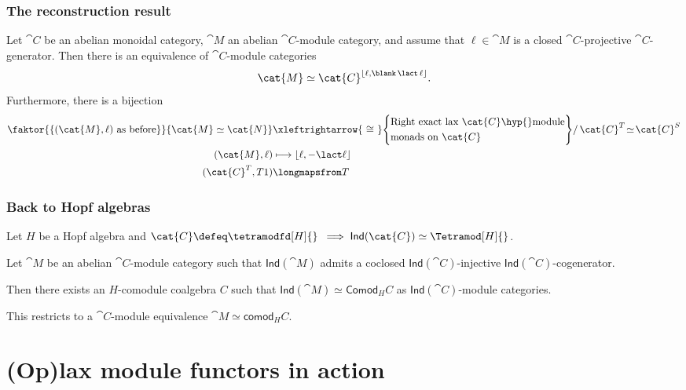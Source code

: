 \documentclass[aspectratio=169,12pt,professionalfont]{beamer}
\renewcommand*{\hom}[1]{\ensuremath{\lfloor#1\rfloor}}
\newcommand*{\Ind}{\mathsf{Ind}}
\begin{document}
\begin{frame}\frametitle{The reconstruction result}
  \begin{theorem}
    Let \(\cat{C}\) be an abelian monoidal category,
    \(\cat{M}\) an abelian \(\cat{C}\)\hyp{}module category,
    and assume that \(\ell \in \cat{M}\) is a closed \(\cat{C}\)\hyp{}projective \(\cat{C}\)\hyp{}generator.
    \pause%
    Then there is an equivalence of \(\cat{C}\)\hyp{}module categories
    \vspace{-0.2cm}\[
      \cat{M} \simeq \cat{C}^{\hom{\ell, \blank \,\lact\, \ell}}.
    \]\vspace{-0.2cm}
    \pause%
    Furthermore, there is a bijection
    \vspace{-0.2cm}\begin{align*}
      \faktor{\{(\cat{M},\ell)\ \text{as before}\}}{\cat{M} \simeq \cat{N}}
      &\xleftrightarrow{\ \cong\ }
        \Bigg\{
        \begin{aligned}
          &\text{Right exact lax \(\cat{C}\)\hyp{}module}\\
          &\text{monads on \(\cat{C}\)}
        \end{aligned}
        \Bigg\}
        /\, \cat{C}^T \!\simeq\! \cat{C}^S \\
      (\cat{M},\ell) &\longmapsto \hom{\ell,-\lact \ell} \\
      (\cat{C}^T, T1) &\longmapsfrom T
    \end{align*}
  \end{theorem}
\end{frame}

\begin{frame}\frametitle{Back to Hopf algebras}
  Let \(H\) be a Hopf algebra and \(\cat{C} \defeq \tetramodfd[H]{}\)
  \pause%
  \(\implies \Ind(\cat{C}) \simeq \Tetramod[H]{}\).
  \pause%

  Let \(\cat{M}\) be an abelian \(\cat{C}\)\hyp{}module category
  such that \(\Ind(\cat{M})\)
  admits a coclosed \(\Ind(\cat{C})\)\hyp{}injective \(\Ind(\cat{C})\)\hyp{}cogenerator.
  \pause%

  Then there exists an \(H\)\hyp{}comodule coalgebra \(C\)
  such that \(\Ind(\cat{M}) \simeq \mathsf{Comod}_{H}C\) as \(\Ind(\cat{C})\)\hyp{}module categories.
  \pause%

  This restricts to a \(\cat{C}\)\hyp{}module equivalence \(\cat{M} \simeq \mathsf{comod}_{H}C\).
\end{frame}

\section{(Op)lax module functors in action}
\end{document}
